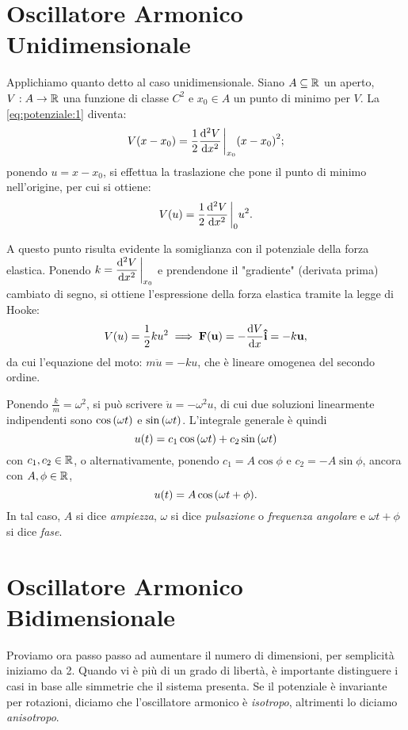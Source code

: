 \section{Oscillatore Armonico Unidimensionale}
    Applichiamo quanto detto al caso unidimensionale. Siano $A\subseteq\mathbb{R}$ un aperto, $V:A\rightarrow\mathbb{R}$ una funzione di classe $C^2$ e $x_0\in A$ un punto di minimo per $V$. La \eqref{eq:potenziale:1} diventa: $$V(x-x_0)=\frac{1}{2}\dv[2]{V}{x}\eval_{x_0}\qty(x-x_0)^2;$$ ponendo $u=x-x_0$, si effettua la traslazione che pone il punto di minimo nell'origine, per cui si ottiene: $$V(u)=\frac{1}{2}\dv[2]{V}{x}\eval_{0}u^2.$$ \par A questo punto risulta evidente la somiglianza con il potenziale della forza elastica. Ponendo $\displaystyle k=\dv[2]{V}{x}\eval_{x_0}$ e prendendone il "gradiente" (derivata prima) cambiato di segno, si ottiene l'espressione della forza elastica tramite la legge di Hooke: $$V\qty(u)=\frac{1}{2}ku^2 \implies \vb{F\qty(\vb{u})}=-\dv{V}{x}\vu{i}=-k\vb{u},$$ da cui l'equazione del moto: $m\ddot{u}=-ku$, che \`e lineare omogenea del secondo ordine. \par Ponendo $\frac{k}{m}=\omega^2$, si pu\`o scrivere $\ddot{u}=-\omega^2u$, di cui due soluzioni linearmente indipendenti sono $\cos\qty(\omega t)$ e $\sin\qty(\omega t)$. L'integrale generale \`e quindi $$u\qty(t)=c_1\cos\qty(\omega t)+c_2\sin\qty(\omega t)$$ con $c_1,c_2\in\mathbb{R}$, o alternativamente, ponendo $c_1=A\cos\phi$ e $c_2=-A\sin\phi$, ancora con $A,\phi\in\mathbb{R}$, $$u\qty(t)=A\cos\qty(\omega t+\phi).$$ In tal caso, $A$ si dice \emph{ampiezza}, $\omega$ si dice \emph{pulsazione} o \emph{frequenza angolare} e $\omega t+\phi$ si dice \emph{fase}.
\section{Oscillatore Armonico Bidimensionale}
    Proviamo ora passo passo ad aumentare il numero di dimensioni, per semplicit\`a iniziamo da 2. Quando vi \`e pi\`u di un grado di libert\`a, \`e importante distinguere i casi in base alle simmetrie che il sistema presenta. Se il potenziale \`e invariante per rotazioni, diciamo che l'oscillatore armonico \`e \emph{isotropo}, altrimenti lo diciamo \emph{anisotropo}.
